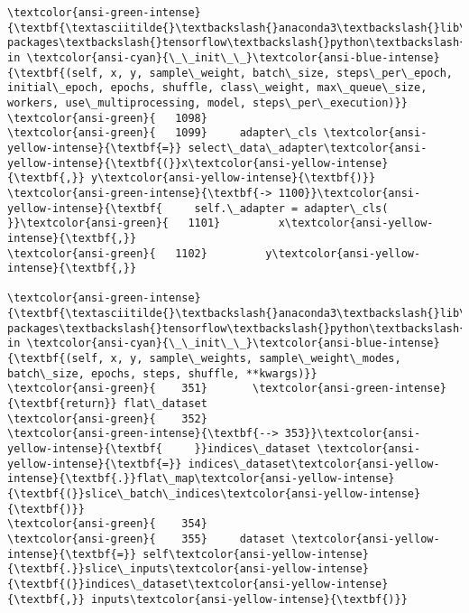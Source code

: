 \documentclass[11pt]{article}
\begin{document}
\begin{Verbatim}[commandchars=\\\{\}, frame=single, framerule=2mm, rulecolor=\color{outerrorbackground}]
\textcolor{ansi-green-intense}{\textbf{\textasciitilde{}\textbackslash{}anaconda3\textbackslash{}lib\textbackslash{}site-packages\textbackslash{}tensorflow\textbackslash{}python\textbackslash{}keras\textbackslash{}engine\textbackslash{}data\_adapter.py}} in \textcolor{ansi-cyan}{\_\_init\_\_}\textcolor{ansi-blue-intense}{\textbf{(self, x, y, sample\_weight, batch\_size, steps\_per\_epoch, initial\_epoch, epochs, shuffle, class\_weight, max\_queue\_size, workers, use\_multiprocessing, model, steps\_per\_execution)}}
\textcolor{ansi-green}{   1098} 
\textcolor{ansi-green}{   1099}     adapter\_cls \textcolor{ansi-yellow-intense}{\textbf{=}} select\_data\_adapter\textcolor{ansi-yellow-intense}{\textbf{(}}x\textcolor{ansi-yellow-intense}{\textbf{,}} y\textcolor{ansi-yellow-intense}{\textbf{)}}
\textcolor{ansi-green-intense}{\textbf{-> 1100}}\textcolor{ansi-yellow-intense}{\textbf{     self.\_adapter = adapter\_cls(
}}\textcolor{ansi-green}{   1101}         x\textcolor{ansi-yellow-intense}{\textbf{,}}
\textcolor{ansi-green}{   1102}         y\textcolor{ansi-yellow-intense}{\textbf{,}}

\textcolor{ansi-green-intense}{\textbf{\textasciitilde{}\textbackslash{}anaconda3\textbackslash{}lib\textbackslash{}site-packages\textbackslash{}tensorflow\textbackslash{}python\textbackslash{}keras\textbackslash{}engine\textbackslash{}data\_adapter.py}} in \textcolor{ansi-cyan}{\_\_init\_\_}\textcolor{ansi-blue-intense}{\textbf{(self, x, y, sample\_weights, sample\_weight\_modes, batch\_size, epochs, steps, shuffle, **kwargs)}}
\textcolor{ansi-green}{    351}       \textcolor{ansi-green-intense}{\textbf{return}} flat\_dataset
\textcolor{ansi-green}{    352} 
\textcolor{ansi-green-intense}{\textbf{--> 353}}\textcolor{ansi-yellow-intense}{\textbf{     }}indices\_dataset \textcolor{ansi-yellow-intense}{\textbf{=}} indices\_dataset\textcolor{ansi-yellow-intense}{\textbf{.}}flat\_map\textcolor{ansi-yellow-intense}{\textbf{(}}slice\_batch\_indices\textcolor{ansi-yellow-intense}{\textbf{)}}
\textcolor{ansi-green}{    354} 
\textcolor{ansi-green}{    355}     dataset \textcolor{ansi-yellow-intense}{\textbf{=}} self\textcolor{ansi-yellow-intense}{\textbf{.}}slice\_inputs\textcolor{ansi-yellow-intense}{\textbf{(}}indices\_dataset\textcolor{ansi-yellow-intense}{\textbf{,}} inputs\textcolor{ansi-yellow-intense}{\textbf{)}}


\end{Verbatim}
\end{document}
